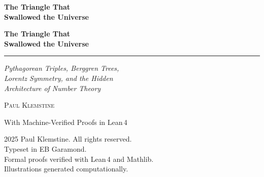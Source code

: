 \documentclass[11pt,openright,twoside]{book}
\theoremstyle{definition}
\begin{document}
\frontmatter

\thispagestyle{empty}
\begin{center}
{\fontsize{24}{28}\selectfont\bfseries\color{chaptercolor}
The Triangle That\\[6pt]Swallowed the Universe}
\end{center}
\clearpage

\thispagestyle{empty}\mbox{}\clearpage

\thispagestyle{empty}
\begin{center}

{\fontsize{32}{38}\selectfont\bfseries\color{chaptercolor}
The Triangle That\\[8pt]Swallowed the Universe}

\vspace{1.5cm}

{\color{accentgold}\rule{0.4\textwidth}{1.5pt}}

\vspace{1.2cm}

{\Large\itshape\color{sectioncolor}
Pythagorean Triples, Berggren Trees,\\[4pt]
Lorentz Symmetry, and the Hidden\\[4pt]
Architecture of Number Theory}

\vspace{2cm}

{\fontsize{18}{22}\selectfont\scshape Paul Klemstine}


{\small\color{pagenum} With Machine-Verified Proofs in Lean\,4}

\end{center}
\clearpage

\thispagestyle{empty}
\begin{flushleft}
\small\color{pagenum}
\textcopyright{} 2025 Paul Klemstine. All rights reserved.\\[8pt]
Typeset in EB Garamond.\\[4pt]
Formal proofs verified with Lean\,4 and Mathlib.\\[4pt]
Illustrations generated computationally.
\end{flushleft}
\clearpage
\end{document}
